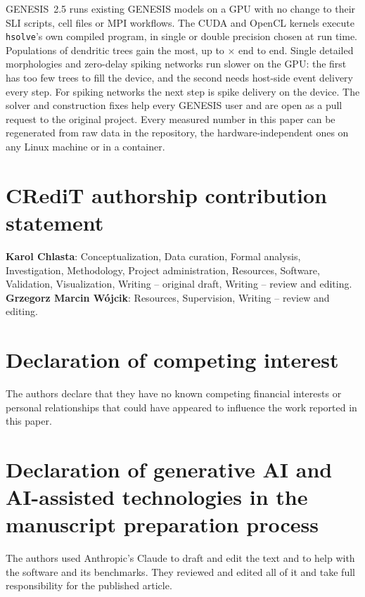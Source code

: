 \documentclass[preprint,12pt,a4paper]{elsarticle}
\begin{document}
\begin{enumerate}
GENESIS~2.5 runs existing GENESIS models on a GPU with no change to their SLI scripts,
cell files or MPI workflows. The CUDA and OpenCL kernels execute \texttt{hsolve}'s own
compiled program, in single or double precision chosen at run time. Populations of
dendritic trees gain the most, up to $\times$ end to end. Single
detailed morphologies and zero-delay spiking networks run slower on the GPU: the first
has too few trees to fill the device, and the second needs host-side event delivery
every step. For spiking networks the next step is spike delivery on the device. The
solver and construction fixes help every GENESIS user and are open as a pull request to
the original project. Every measured number in this paper can be regenerated from raw
data in the repository, the hardware-independent ones on any Linux machine or in a
container.

\end{enumerate}

\section*{CRediT authorship contribution statement}

\textbf{Karol Chlasta}: Conceptualization, Data curation, Formal analysis,
Investigation, Methodology, Project administration, Resources, Software,
Validation, Visualization, Writing -- original draft, Writing -- review and
editing.
\textbf{Grzegorz Marcin W\'ojcik}: Resources, Supervision,
Writing -- review and editing.

\section*{Declaration of competing interest}

The authors declare that they have no known competing financial interests or
personal relationships that could have appeared to influence the work reported
in this paper.

\section*{Declaration of generative AI and AI-assisted technologies in the manuscript preparation process}

The authors used Anthropic's Claude to draft and edit the text and to help with the software and its benchmarks. They reviewed and edited all of it and take full responsibility for the published article.
\end{document}
